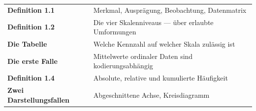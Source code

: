 \begin{merksatz}
\begin{center}
\renewcommand{\arraystretch}{1.5}
\begin{tabular}{@{}P{3.0cm}P{5.6cm}@{}}
\toprule
\textbf{Definition 1.1} & Merkmal, Ausprägung, Beobachtung, Datenmatrix\\
\textbf{Definition 1.2} & Die vier Skalenniveaus --- über erlaubte Umformungen\\
\textbf{Die Tabelle} & Welche Kennzahl auf welcher Skala zulässig ist\\
\textbf{Die erste Falle} & Mittelwerte ordinaler Daten sind kodierungsabhängig\\
\textbf{Definition 1.4} & Absolute, relative und kumulierte Häufigkeit\\
\textbf{Zwei Darstellungsfallen} & Abgeschnittene Achse, Kreisdiagramm\\
\bottomrule
\end{tabular}
\end{center}

\begin{center}
\begin{minipage}{0.88\textwidth}
\end{minipage}
\end{center}
\end{merksatz}
